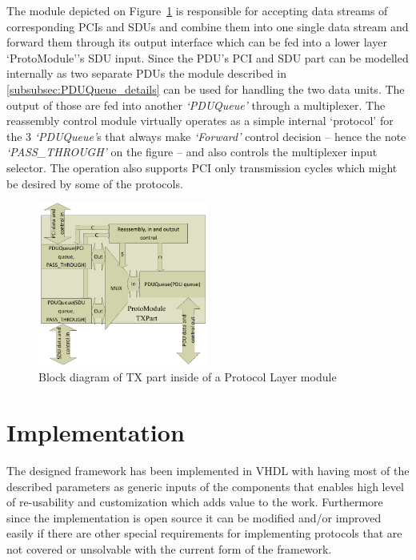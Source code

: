 \documentclass[conference]{IEEEtran}
\begin{document}
The module depicted on Figure~\ref{fig:proto_layer_tx_sch} is responsible for accepting data streams of corresponding PCIs and SDUs and combine them into one single data stream and forward them through its output interface which can be fed into a lower layer `ProtoModule''s SDU input. Since the PDU's PCI and SDU part can be modelled internally as two separate PDUs the module described in \ref{subsubsec:PDUQueue_details} can be used for handling the two data units. The output of those are fed into another \emph{`PDUQueue'} through a multiplexer. The reassembly control module virtually operates as a simple internal `protocol' for the 3 \emph{`PDUQueue'}s that always make \emph{`Forward'} control decision -- hence the note \emph{`PASS\_THROUGH'} on the figure -- and also controls the multiplexer input selector. The operation also supports PCI only transmission cycles which might be desired by some of the protocols.
\begin{figure}[!htb]
    \centering
    \includegraphics[width=0.5\textwidth]{figures_raw/proto_tx_part_imp.pdf}
    \caption{Block diagram of TX part inside of a Protocol Layer module}
    \label{fig:proto_layer_tx_sch}
\end{figure}

\section{Implementation}\label{sec:Implementation}

The designed framework has been implemented in VHDL with having most of the described parameters as generic inputs of the components that enables high level of re-usability and customization which adds value to the work. Furthermore since the implementation is open source it can be modified and/or improved easily if there are other special requirements for implementing protocols that are not covered or unsolvable with the current form of the framework. 
\end{document}
